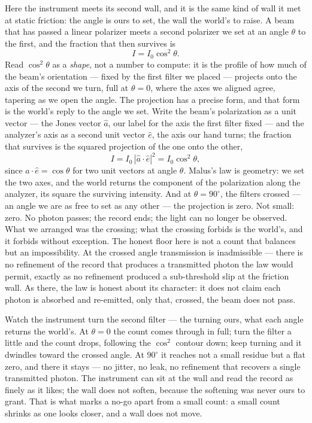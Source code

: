 Here the instrument meets its second wall, and it is the same kind of wall it met at static friction: the
angle is ours to set, the wall the world's to raise. A beam that has passed a linear polarizer meets a second
polarizer we set at an angle $\theta$ to the first, and the fraction that then survives is
\begin{equation}
  I = I_0 \cos^2\theta .
\end{equation}
Read $\cos^2\theta$ as a \emph{shape}, not a number to compute: it is the profile of how much of the beam's
orientation --- fixed by the first filter we placed --- projects onto the axis of the second we turn, full at
$\theta = 0$, where the axes we aligned agree, tapering as we open the angle. The projection has a precise
form, and that form is the world's reply to the angle we set. Write the beam's polarization as a unit vector
--- the Jones vector $\hat a$, our label for the axis the first filter fixed --- and the analyzer's axis as a
second unit vector $\hat e$, the axis our hand turns; the fraction that survives is the squared projection of
the one onto the other,
\begin{equation}
  I = I_0\,|\hat a \cdot \hat e|^2 = I_0 \cos^2\theta,
\end{equation}
since $\hat a \cdot \hat e = \cos\theta$ for two unit vectors at angle $\theta$. Malus's law is geometry: we
set the two axes, and the world returns the component of the polarization along the analyzer, its square the
surviving intensity. And at $\theta = 90^\circ$, the filters crossed --- an angle we are as free to set as any
other --- the projection is zero. Not small: zero. No photon passes; the record ends; the light can no longer
be observed. What we arranged was the crossing; what the crossing forbids is the world's, and it forbids
without exception. The honest floor here is not a count that balances but an impossibility. At the crossed
angle transmission is inadmissible --- there is no refinement of the record that produces a transmitted photon
the law would permit, exactly as no refinement produced a sub-threshold slip at the friction wall. As there,
the law is honest about its character: it does not claim each photon is absorbed and re-emitted, only that,
crossed, the beam does not pass.

Watch the instrument turn the second filter --- the turning ours, what each angle returns the world's. At
$\theta = 0$ the count comes through in full; turn the filter a little and the count drops, following the
$\cos^2$ contour down; keep turning and it dwindles toward the crossed angle. At $90^\circ$ it reaches not a
small residue but a flat zero, and there it stays --- no jitter, no leak, no refinement that recovers a single
transmitted photon. The instrument can sit at the wall and read the record as finely as it likes; the wall
does not soften, because the softening was never ours to grant. That is what marks a no-go apart from a small
count: a small count shrinks as one looks closer, and a wall does not move.

